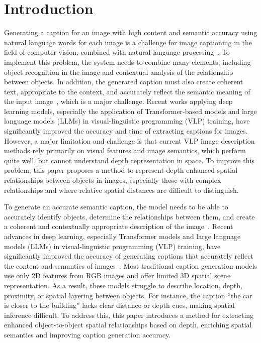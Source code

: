 \documentclass[runningheads,14pt]{llncs}
\begin{document}
\section{Introduction}

Generating a caption for an image with high content and semantic accuracy using natural language words for each image is a challenge for image captioning in the field of computer vision, combined with natural language processing~\cite{vinyals2015show,karpathy2015deep}. To implement this problem, the system needs to combine many elements, including object recognition in the image and contextual analysis of the relationship between objects. In addition, the generated caption must also create coherent text, appropriate to the context, and accurately reflect the semantic meaning of the input image~\cite{vinyals2015show,xu2015show}, which is a major challenge. Recent works applying deep learning models, 
especially the application of Transformer-based models and large language models (LLMs) in visual-linguistic programming (VLP) training, have significantly improved the accuracy and time of extracting captions for images. However, a major limitation and challenge is that current VLP image description methods rely primarily on visual features and image semantics, which perform quite well, but cannot understand depth representation in space. To improve this problem, this paper proposes a method to represent depth-enhanced spatial relationships between objects in images, especially those with complex relationships and where relative spatial distances are difficult to distinguish. 

To generate an accurate semantic caption, the model needs to be able to accurately identify objects, determine the relationships between them, and create a coherent and contextually appropriate description of the image~\cite{vinyals2015show,xu2015show}. Recent advances in deep learning, especially Transformer models and large language models (LLMs) in visual-linguistic programming (VLP) training, have significantly improved the accuracy of generating captions that accurately reflect the content and semantics of images~\cite{li2024exploring}.
Most traditional caption generation models use only 2D features from RGB images and offer limited 3D spatial scene representation. As a result, these models struggle to describe location, depth, proximity, or spatial layering between objects. For instance, the caption “the car is closer to the building” lacks clear distance or depth cues, making spatial inference difficult. To address this, this paper introduces a method for extracting enhanced object-to-object spatial relationships based on depth, enriching spatial semantics and improving caption generation accuracy.
\end{document}
